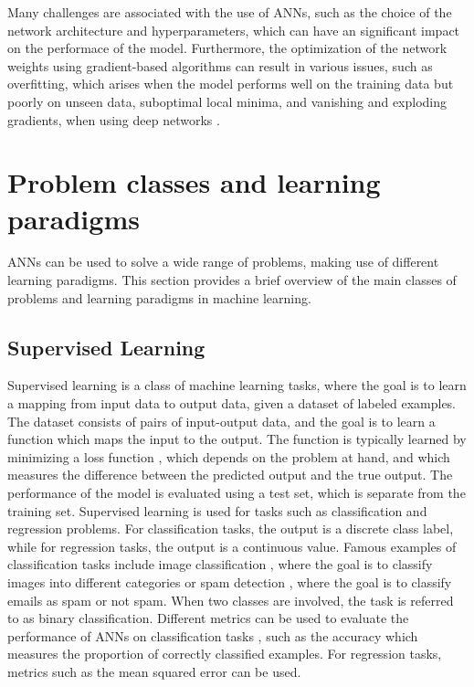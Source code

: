 Many challenges are associated with the use of ANNs, such as the choice of the network architecture and hyperparameters, which can have an significant
impact on the performace of the model. Furthermore, the optimization of the network weights using gradient-based algorithms can result in various issues, such
as overfitting, which arises when the model performs well on the training data but poorly on unseen data, suboptimal local minima, and vanishing and
exploding gradients, when using deep networks \cite{overfitting,vanishing_gradient}.

\section{Problem classes and learning paradigms}

ANNs can be used to solve a wide range of problems, making use of different learning paradigms. This section provides a brief overview of the main classes of
problems and learning paradigms in machine learning.

\subsection{Supervised Learning}

Supervised learning is a class of machine learning tasks, where the goal is to learn a mapping from input data to output data, given a dataset of labeled
examples. The dataset consists of pairs of input-output data, and the goal is to learn a function which maps the input to the output. The function is typically
learned by minimizing a loss function \cite{on_loss,loss_survey}, which depends on the problem at hand, and which measures the difference between the predicted output and
the true output. The performance of the model is evaluated using a test set, which is separate from the training set. Supervised learning is used for tasks such
as classification and regression problems. For classification tasks, the output is a discrete class label, while for regression tasks, the output is a continuous value.
Famous examples of classification tasks include image classification \cite{cnn,cnn_survey}, where the goal is to classify images into different categories or spam detection \cite{spam_survey},
where the goal is to classify emails as spam or not spam. When two classes are involved, the task is referred to as binary classification.
Different metrics can be used to evaluate the performance of ANNs on classification tasks \cite{classification_metrics}, such as the accuracy which measures the proportion of correctly
classified examples. For regression tasks, metrics such as the mean squared error can be used.

